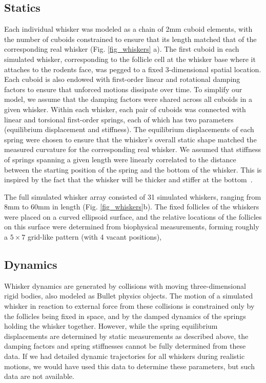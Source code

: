 \subsection{Statics} 
Each individual whisker was modeled as a chain of 2mm cuboid elements, with the number of cuboids constrained to ensure that its length matched that of the corresponding real whisker (Fig. \ref{fig_whiskers} a).
The first cuboid in each simulated whisker, corresponding to the follicle cell at the whisker base where it attaches to the rodents face, was pegged to a fixed 3-dimensional spatial location.  
Each cuboid is also endowed with first-order linear and rotational damping factors to ensure that unforced motions dissipate over time. 
To simplify our model, we assume that the damping factors were shared across all cuboids in a given whisker.  
Within each whisker, each pair of cuboids was connected with linear and torsional first-order springs, each of which has two parameters (equilibrium displacement and stiffness).  
The equilibrium displacements of each spring were chosen to ensure that the whisker's overall static shape matched the measured curvature for the corresponding real whisker.   
We assumed that stiffness of springs spanning a given length were linearly correlated to the distance between the starting position of the spring and the bottom of the whisker. 
This is inspired by the fact that the whisker will be thicker and stiffer at the bottom~\cite{Hartmann:2015}.

The full simulated whisker array consisted of 31 simulated whiskers, ranging from 8mm to 60mm in length (Fig. \ref{fig_whiskers}b). 
The fixed follicles of the whiskers were placed on a curved ellipsoid surface, and the relative locations of the follicles on this surface were determined from biophysical measurements, forming roughly a $5\times7$ grid-like pattern (with 4 vacant positions),

\subsection{Dynamics}
Whisker dynamics are generated by collisions with moving three-dimensional rigid bodies, also modeled as Bullet physics objects.  
The motion of a simulated whisker in reaction to external force from these collisions is constrained only by the follicles being fixed in space, and by the damped dynamics of the springs holding the whisker together. 
However, while the spring equilibrium displacements are determined by static measurements as described above, the damping factors and spring stiffnesses cannot be fully determined from these data.  
If we had detailed dynamic trajectories for all whiskers during realistic motions, we would have used this data to determine these parameters, but such data are not available.  

